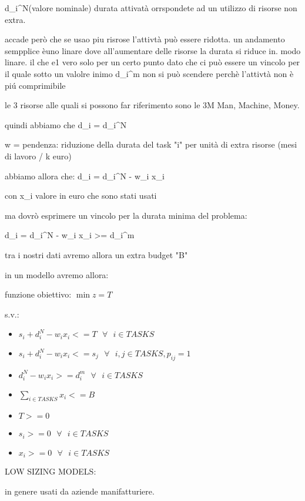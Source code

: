 {d_i^N(valore nominale) durata attivatà orrspondete ad un utilizzo di risorse non extra.

accade però che se usao piu risrose l'attivtà può essere ridotta. un andamento sempplice èuno linare dove all'aumentare delle risorse la durata si riduce in. modo linare. il che e1 vero solo per un certo punto dato che ci può essere un vincolo per il quale sotto un valolre inimo d_i^m non si può scendere perchè l'attivtà non è piú comprimibile


le 3 risorse alle quali si possono far riferimento sono le 3M Man, Machine, Money.


quindi abbiamo che d_i = d_i^N

w = pendenza: riduzione della durata del task "i" per unità di extra risorse (mesi di lavoro / k euro)

abbiamo allora che: d_i = d_i^N - w_i x_i

con x_i valore in euro che sono stati usati

ma dovrò esprimere un vincolo per la durata minima del problema:

d_i = d_i^N - w_i x_i >= d_i^m


tra i nostri dati avremo allora un extra budget "B"




in un modello avremo allora:

funzione obiettivo: $\min z = T$

s.v.:

\begin{itemize}
	\item $s_i + d_i^N - w_i x_i <= T\ \ \ \forall\ \ \ i \in TASKS$
	\item $s_i + d_i^N - w_i x_i <= s_j\ \ \ \forall\ \ \ i, j \in TASKS, p_{ij} = 1$
	\item $d_i^N - w_i x_i >= d_i^m\ \ \ \forall\ \ \ i \in TASKS$
	\item $\sum_{i \in TASKS} x_i <= B$
	\item $T >= 0$
	\item $s_i >= 0\ \ \ \forall\ \ \ i \in TASKS$
	\item $x_i >= 0\ \ \ \forall\ \ \ i \in TASKS$
\end{itemize}











LOW SIZING MODELS:

in genere usati da aziende manifatturiere. 

}
